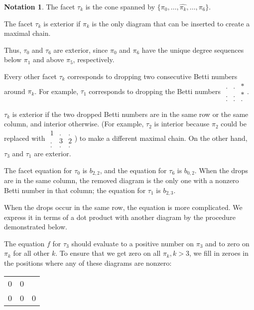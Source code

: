 \documentclass[12pt]{amsart}
\theoremstyle{plain}
\theoremstyle{definition}
\newtheorem{notation}[thm]{Notation}
\theoremstyle{remark}
\begin{document}
\begin{notation}The facet $\tau_{k}$ is the cone spanned by
  $\{\pi_0,\dots,\hat{\pi_k},\dots,\pi_6\}$.  
\end{notation}

The facet $\tau_{k}$ is exterior if $\pi_{k}$ is the only diagram that
can be inserted to create a maximal chain.  

Thus, $\tau_0$ and $\tau_6$ are exterior, since $\pi_0$ and $\pi_6$
have the unique degree sequences below $\pi_1$ and above $\pi_5$,
respectively.  

Every other facet $\tau_{k}$ corresponds to dropping two consecutive
Betti numbers around $\pi_k$.  For example, $\tau_1$ corresponds to
dropping the Betti numbers $\begin{array}{ccc}.&.&*\\.&.&*\\.&.&.\end{array}$.

  $\tau_k$ is exterior if the two dropped Betti numbers are in the
  same row or the same column, and interior otherwise.  (For example,
  $\tau_2$ is interior because $\pi_2$ could be replaced with
  $\begin{array}{ccc}1&.&.\\.&3&2\\.&.&.\end{array}$) to make a different maximal
    chain.  On the other hand, $\tau_3$ and $\tau_1$ are exterior.

The facet equation for $\tau_0$ is $b_{2,2}$, and the equation for
$\tau_6$ is $b_{0,2}$.  When the drops are in the same column, the
removed diagram is the only one with a nonzero Betti number in that
column; the equation for $\tau_1$ is $b_{2,3}$.  

When the drops occur in the same row, the equation is more
complicated.  We express it in terms of a dot product with another
diagram by the procedure demonstrated below.

The equation $f$ for $\tau_3$ should evaluate to a positive number on
$\pi_3$ and to zero on $\pi_k$ for all other $k$.  To ensure that we
get zero on all $\pi_k, k>3$, we fill in zeroes in the positions where
any of these diagrams are nonzero:

\begin{tabular}{|c|c|c|}
\hline
&&\\
\hline
0&0&\\
\hline
0&0&0\\
\hline
\end{tabular}
\end{document}
